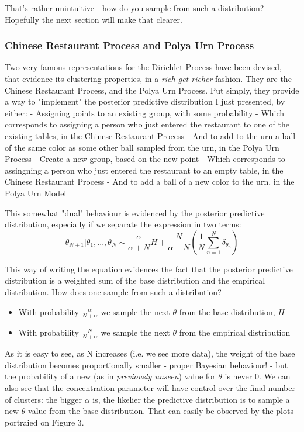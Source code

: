 \documentclass[11pt]{article}
\begin{document}
That's rather unintuitive - how do you sample from such a distribution?
Hopefully the next section will make that clearer.
	
\subsubsection{Chinese Restaurant Process and Polya Urn Process}\label{chinese-restaurant-process-and-polya-urn-process}
	
Two very famous representations for the Dirichlet Process have been
devised, that evidence its clustering properties, in a \emph{rich get
richer} fashion. They are the Chinese Restaurant Process, and the Polya
Urn Process. Put simply, they provide a way to "implement" the posterior
predictive distribution I just presented, by either: - Assigning points
to an existing group, with some probability - Which corresponds to
assigning a person who just entered the restaurant to one of the
existing tables, in the Chinese Restaurant Process - And to add to the
urn a ball of the same color as some other ball sampled from the urn, in
the Polya Urn Process - Create a new group, based on the new point -
Which corresponds to assingning a person who just entered the restaurant
to an empty table, in the Chinese Restaurant Process - And to add a ball
of a new color to the urn, in the Polya Urn Model
	
This somewhat "dual" behaviour is evidenced by the posterior predictive
distribution, especially if we separate the expression in two terms:
\[\theta_{N+1} | \theta_1, ..., \theta_N \sim \frac{\alpha}{\alpha+N}H + 
\frac{N}{\alpha+N}(\frac{1}{N}\sum_{n=1}^{N}\delta_{\theta_n})\]
	
This way of writing the equation evidences the fact that the posterior
predictive distribution is a weighted sum of the base distribution and
the empirical distribution. How does one sample from such a
distribution? 
\begin{itemize}
	\item With probability \(\frac{\alpha}{N+\alpha}\) we sample
	the next \(\theta\) from the base distribution, \(H\)
	\item With probability
\(\frac{N}{N+\alpha}\) we sample the next \(\theta\) from the empirical
distribution
\end{itemize} 

As it is easy to see, as N increases (i.e. we see more data), the weight
of the base distribution becomes proportionally smaller - proper
Bayesian behaviour! - but the probability of a new (as in
\emph{previously unseen}) value for \(\theta\) is never \(0\). We can
also see that the concentration parameter will have control over the
final number of clusters: the bigger \(\alpha\) is, the likelier the
predictive distribution is to sample a new \(\theta\) value from the
base distribution. That can easily be observed by the plots portraied
on Figure 3.
	
\end{document}
